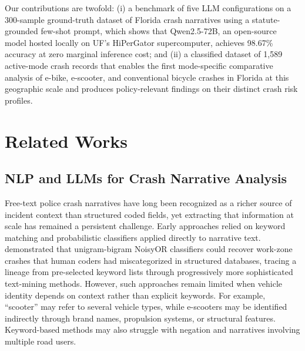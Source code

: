 \documentclass[numbered]{trbunofficial}
\begin{document}
Our contributions are twofold: (i) a benchmark of five LLM configurations on a 300-sample ground-truth dataset of Florida crash narratives using a statute-grounded few-shot prompt, which shows that Qwen2.5-72B, an open-source model hosted locally on UF’s HiPerGator supercomputer, achieves 98.67\% accuracy at zero marginal inference cost; and (ii) a classified dataset of 1,589 active-mode crash records that enables the first mode-specific comparative analysis of e-bike, e-scooter, and conventional bicycle crashes in Florida at this geographic scale and produces policy-relevant findings on their distinct crash risk profiles.



\section{Related Works}
\label{sec:lit}

\subsection{NLP and LLMs for Crash Narrative Analysis}

Free-text police crash narratives have long been recognized as a richer source of incident context than structured coded fields, yet extracting that information at scale has remained a persistent challenge. Early approaches relied on keyword matching and probabilistic classifiers applied directly to narrative text. \citet{Sayed2021} demonstrated that unigram-bigram NoisyOR classifiers could recover work-zone crashes that human coders had miscategorized in structured databases, tracing a lineage from pre-selected keyword lists through progressively more sophisticated text-mining methods. However, such approaches remain limited when vehicle identity depends on context rather than explicit keywords. For example, ``scooter'' may refer to several vehicle types, while e-scooters may be identified indirectly through brand names, propulsion systems, or structural features. Keyword-based methods may also struggle with negation and narratives involving multiple road users.
\end{document}
